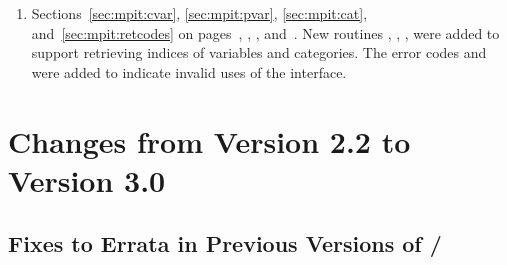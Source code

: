 \begin{enumerate}
\item 
Sections~\ref{sec:mpit:cvar}, \ref{sec:mpit:pvar}, \ref{sec:mpit:cat}, and~\ref{sec:mpit:retcodes}
on pages~\pageref{sec:mpit:cvar}, \pageref{sec:mpit:pvar}, \pageref{sec:mpit:cat}, and~\pageref{sec:mpit:retcodes}.
\newline 
New routines , ,
, were added to support retrieving
indices of variables and categories. 
The error codes  and 
were added to indicate invalid uses of the interface.

\end{enumerate}


\section{Changes from Version 2.2 to Version 3.0}
\label{subsec:22to30}
 
% 
% 
%
%
% 
%
%
%
% 

\subsection{Fixes to Errata in Previous Versions of \texorpdfstring{\MPI/}{MPI}} 
\label{sec:changes-22-30-errata}
 
